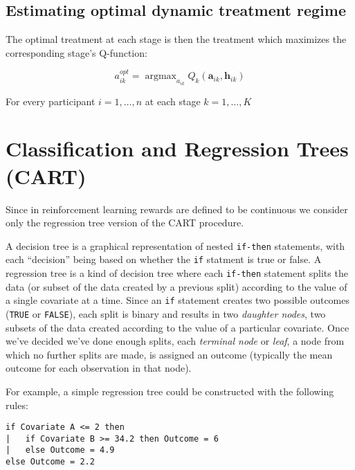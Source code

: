 \documentclass[12pt]{article}
\DeclareMathOperator*{\argmax}{argmax}
\begin{document}

\subsection{Estimating optimal dynamic treatment regime} %
\label{sub:estimating_optimal_dynamic_treatment_regime}

The optimal treatment at each stage is then the treatment which maximizes the corresponding stage's Q-function:

\begin{equation}
  a^{opt}_{ik} = \argmax_{a_{ik}} Q_{k}(\bm{a}_{ik}, \bm{h}_{ik})
\end{equation}

For every participant $i = 1, \ldots, n$ at each stage $k = 1, \ldots, K$






\section{Classification and Regression Trees (CART)} %
\label{sec:rpart}

Since in reinforcement learning rewards are defined to be continuous we consider only the regression tree version of the CART procedure.

A decision tree is a graphical representation of nested \texttt{if-then} statements, with each ``decision'' being based on whether the \texttt{if} statment is true or false. A regression tree is a kind of decision tree where each \texttt{if-then} statement splits the data (or subset of the data created by a previous split) according to the value of a single covariate at a time. Since an \texttt{if} statement creates two possible outcomes (\texttt{TRUE} or \texttt{FALSE}), each split is binary and results in two \emph{daughter nodes}, two subsets of the data created according to the value of a particular covariate. Once we've decided we've done enough splits, each \emph{terminal node} or \emph{leaf}, a node from which no further splits are made, is assigned an outcome (typically the mean outcome for each observation in that node).

For example, a simple regression tree could be constructed with the following rules:
\begin{verbatim}
if Covariate A <= 2 then
|   if Covariate B >= 34.2 then Outcome = 6
|   else Outcome = 4.9
else Outcome = 2.2
\end{verbatim}
\end{document}
